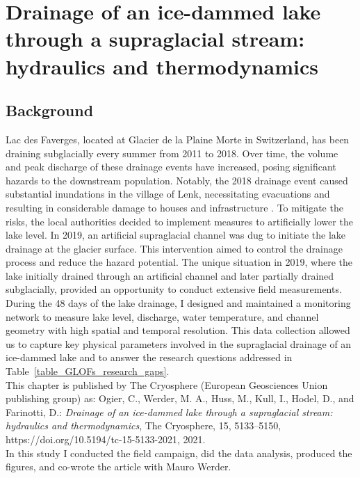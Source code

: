 \chapter[Hydraulics and thermodynamics of an ice-dammed lake drainage]{Drainage of an ice-dammed lake through a supraglacial stream: hydraulics and thermodynamics}
\label{ch:chapter_plainemorte}


\section{Background}

Lac des Faverges, located at Glacier de la Plaine Morte in Switzerland, has been draining subglacially every summer from 2011 to 2018. Over time, the volume and peak discharge of these drainage events have increased, posing significant hazards to the downstream population. Notably, the 2018 drainage event caused substantial inundations in the village of Lenk, necessitating evacuations and resulting in considerable damage to houses and infrastructure \citep{GemeindeLenk2019}. To mitigate the risks, the local authorities decided to implement measures to artificially lower the lake level. In 2019, an artificial supraglacial channel was dug to initiate the lake drainage at the glacier surface. This intervention aimed to control the drainage process and reduce the hazard potential. 
%
The unique situation in 2019, where the lake initially drained through an artificial channel and later partially drained subglacially, provided an opportunity to conduct extensive field measurements. During the 48 days of the lake drainage, I designed and maintained a monitoring network to measure lake level, discharge, water temperature, and channel geometry with high spatial and temporal resolution. This data collection allowed us to capture key physical parameters involved in the supraglacial drainage of an ice-dammed lake and to answer the research questions addressed in Table~\ref{table_GLOFs_research_gaps}.\\
This chapter is published by The Cryosphere (European Geosciences Union publishing
group) as: Ogier, C., Werder, M. A., Huss, M., Kull, I., Hodel, D., and Farinotti, D.: \textit{Drainage of an ice-dammed lake through a supraglacial stream: hydraulics and thermodynamics}, The Cryosphere, 15, 5133–5150, https://doi.org/10.5194/tc-15-5133-2021, 2021.\\
In this study I conducted the field campaign, did the data analysis, produced the figures, and co-wrote the article with Mauro Werder.

